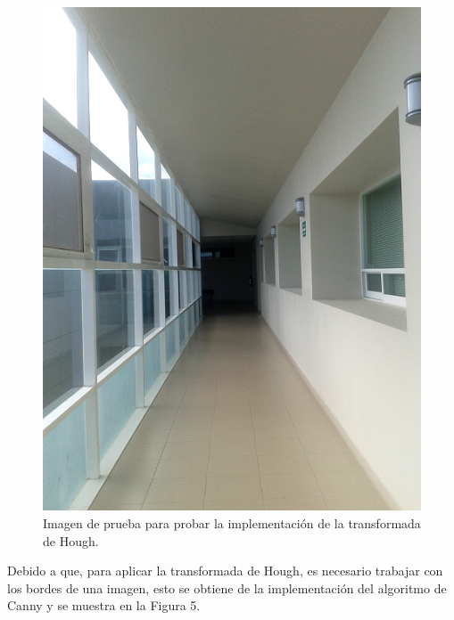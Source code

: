 \documentclass[conference]{IEEEtran}
\begin{document}
\begin{figure}[h]
	\setlength{\unitlength}{0.105in}
	\centering
	\includegraphics[scale=0.25]{./images/dem1.png}
	\caption{ Imagen de prueba para probar la implementaci\'on de la transformada de Hough. }
\end{figure}

\newpage
Debido a que, para aplicar la transformada de Hough, es necesario trabajar con los bordes de una imagen, esto se obtiene de la implementaci\'on del algoritmo de Canny y se muestra en la Figura 5.
\end{document}
